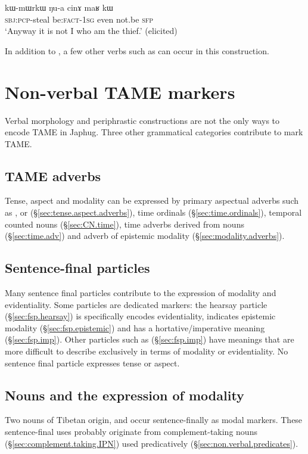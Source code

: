 \begin{exe}
	\ex \label{ex:Nua.cinA.maR.kW}
	\gll  kɯ-mɯrkɯ ŋu-a cinɤ maʁ kɯ  \\
	\textsc{sbj}:\textsc{pcp}-steal be:\textsc{fact}-\textsc{1sg} even not.be \textsc{sfp} \\
	\glt `Anyway it is not I who am the thief.' (elicited)
\end{exe}

In addition to , a few other verbs such as  can occur in this construction.

\section{Non-verbal TAME markers}  \label{sec:non.verb.TAME}
Verbal morphology and periphrastic constructions are not the only ways to encode TAME in Japhug. Three other grammatical categories contribute to mark TAME. 


\subsection{TAME adverbs} 
Tense, aspect and modality can be expressed by primary aspectual adverbs such as ,  or  (§\ref{sec:tense.aspect.adverbs}), time ordinals (§\ref{sec:time.ordinals}), temporal counted nouns (§\ref{sec:CN.time}), time adverbs derived from nouns (§\ref{sec:time.adv}) and adverb of epistemic modality (§\ref{sec:modality.adverbs}).


\subsection{Sentence-final particles} 
Many sentence final particles contribute to the expression of modality and evidentiality. Some particles are dedicated markers: the hearsay particle  (§\ref{sec:fsp.hearsay}) is specifically encodes evidentiality,   indicates epistemic modality (§\ref{sec:fsp.epistemic}) and  has a hortative/imperative meaning (§\ref{sec:fsp.imp}). Other particles such as  (§\ref{sec:fsp.imp}) have meanings that are more difficult to describe exclusively in terms of modality or evidentiality. No sentence final particle expresses tense or aspect.


\subsection{Nouns and the expression of modality} \label{sec:nouns.TAME}
 
Two nouns of Tibetan origin,  and  occur sentence-finally as modal markers. These sentence-final uses probably originate from com\-ple\-ment-taking nouns (§\ref{sec:complement.taking.IPN}) used predicatively (§\ref{sec:non.verbal.predicates}).

